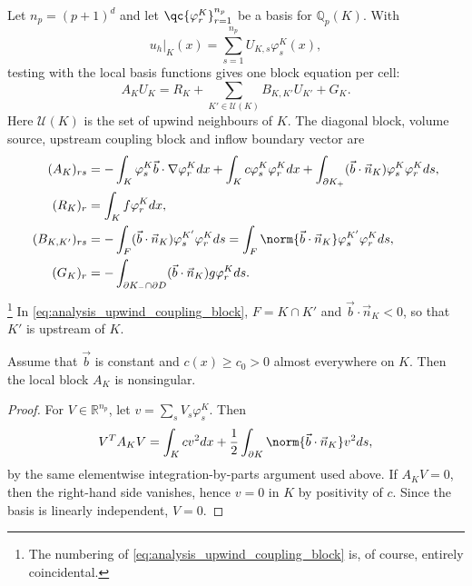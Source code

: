 \documentclass[final]{amsart}
\begin{document}
Let $n_p=(p+1)^d$ and let $\qc{\varphi_r^K}_{r=1}^{n_p}$ be a basis for
$\mathbb{Q}_p(K)$. With
\begin{equation}
u_h|_K(x)
=
\sum_{s=1}^{n_p}
U_{K,s}\varphi_s^K(x),
\label{eq:analysis_local_expansion}
\end{equation}
testing with the local basis functions gives one block equation per
cell:
\begin{equation}
A_K U_K
=
R_K
+
\sum_{K'\in\mathcal{U}(K)}
B_{K,K'}U_{K'}
+
G_K.
\label{eq:analysis_cell_block_equation}
\end{equation}
Here $\mathcal{U}(K)$ is the set of upwind neighbours of $K$. The
diagonal block, volume source, upstream coupling block and inflow
boundary vector are
\begin{align}
(A_K)_{rs}
&=
-\int_K
\varphi_s^K\vec b\cdot\nabla\varphi_r^K dx
+
\int_K
c\varphi_s^K\varphi_r^K dx
+
\int_{\partial K_+}
(\vec b\cdot\vec n_K)
\varphi_s^K\varphi_r^K ds,
\label{eq:analysis_local_diagonal_block}
\\
(R_K)_r
&=
\int_K f\varphi_r^K dx,
\label{eq:analysis_local_source_vector}
\\
(B_{K,K'})_{rs}
&=
-\int_F
(\vec b\cdot\vec n_K)
\varphi_s^{K'}\varphi_r^K ds
=
\int_F
\norm{\vec b\cdot\vec n_K}
\varphi_s^{K'}\varphi_r^K ds,
\label{eq:analysis_upwind_coupling_block}
\\
(G_K)_r
&=
-\int_{\partial K_-\cap\partial D}
(\vec b\cdot\vec n_K)g\varphi_r^K ds.
\label{eq:analysis_boundary_inflow_vector}
\end{align}
\footnote{The numbering of \eqref{eq:analysis_upwind_coupling_block}
is, of course, entirely coincidental.}  In
\eqref{eq:analysis_upwind_coupling_block}, $F=K\cap K'$ and $\vec
b\cdot\vec n_K<0$, so that $K'$ is upstream of $K$.

\begin{lemma}
\label{lem:analysis_local_block_nonsingularity}
Assume that $\vec b$ is constant and $c(x)\geq c_0>0$ almost everywhere
on $K$. Then the local block $A_K$ is nonsingular.
\end{lemma}

\begin{proof}
For $V\in\mathbb{R}^{n_p}$, let
$v=\sum_s V_s\varphi_s^K$. Then
\begin{equation}
V^T A_K V
=
\int_K c v^2 dx
+
\frac{1}{2}
\int_{\partial K}
\norm{\vec b\cdot\vec n_K}v^2 ds,
\end{equation}
by the same elementwise integration-by-parts argument used above. If
$A_KV=0$, then the right-hand side vanishes, hence $v=0$ in $K$ by
positivity of $c$. Since the basis is linearly independent, $V=0$.
\end{proof}
\end{document}
